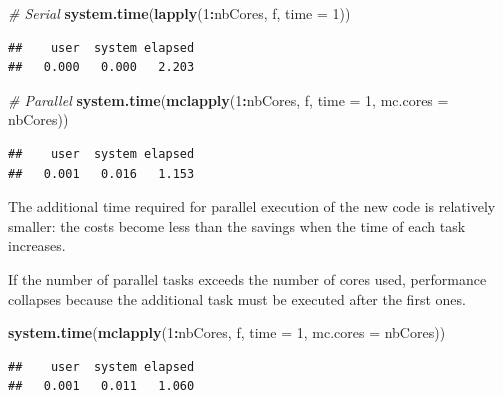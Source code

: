 \documentclass[
  12pt,
  american,
  a4paper,
  extrafontsizes,onecolumn,openright
  ]{memoir}
\newenvironment{Shaded}{\begin{snugshade}}{\end{snugshade}}
\newcommand{\AttributeTok}[1]{\textcolor[rgb]{0.13,0.29,0.53}{#1}}
\newcommand{\CommentTok}[1]{\textcolor[rgb]{0.56,0.35,0.01}{\textit{#1}}}
\newcommand{\DecValTok}[1]{\textcolor[rgb]{0.00,0.00,0.81}{#1}}
\newcommand{\FunctionTok}[1]{\textcolor[rgb]{0.13,0.29,0.53}{\textbf{#1}}}
\newcommand{\NormalTok}[1]{#1}
\newcommand{\SpecialCharTok}[1]{\textcolor[rgb]{0.81,0.36,0.00}{\textbf{#1}}}
\newlength{\rf}
\begin{document}
\scriptsize

\begin{Shaded}
\begin{Highlighting}[]
\CommentTok{\# Serial}
\FunctionTok{system.time}\NormalTok{(}\FunctionTok{lapply}\NormalTok{(}\DecValTok{1}\SpecialCharTok{:}\NormalTok{nbCores, f, }\AttributeTok{time =} \DecValTok{1}\NormalTok{))}
\end{Highlighting}
\end{Shaded}

\begin{verbatim}
##    user  system elapsed 
##   0.000   0.000   2.203
\end{verbatim}

\begin{Shaded}
\begin{Highlighting}[]
\CommentTok{\# Parallel}
\FunctionTok{system.time}\NormalTok{(}\FunctionTok{mclapply}\NormalTok{(}\DecValTok{1}\SpecialCharTok{:}\NormalTok{nbCores, f, }\AttributeTok{time =} \DecValTok{1}\NormalTok{, }\AttributeTok{mc.cores =}\NormalTok{ nbCores))}
\end{Highlighting}
\end{Shaded}

\begin{verbatim}
##    user  system elapsed 
##   0.001   0.016   1.153
\end{verbatim}

\normalsize

The additional time required for parallel execution of the new code is relatively smaller: the costs become less than the savings when the time of each task increases.

If the number of parallel tasks exceeds the number of cores used, performance collapses because the additional task must be executed after the first ones.

\scriptsize

\begin{Shaded}
\begin{Highlighting}[]
\FunctionTok{system.time}\NormalTok{(}\FunctionTok{mclapply}\NormalTok{(}\DecValTok{1}\SpecialCharTok{:}\NormalTok{nbCores, f, }\AttributeTok{time =} \DecValTok{1}\NormalTok{, }\AttributeTok{mc.cores =}\NormalTok{ nbCores))}
\end{Highlighting}
\end{Shaded}

\begin{verbatim}
##    user  system elapsed 
##   0.001   0.011   1.060
\end{verbatim}
\end{document}
